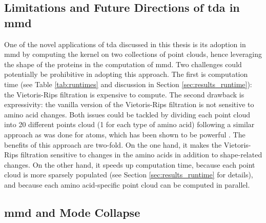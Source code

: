 

\subsection{Limitations and Future Directions of \gls{tda} in \gls{mmd}}\label{sec:tda_limitations}

One of the novel applications of \gls{tda} discussed in this thesis is its
adoption in \gls{mmd} by computing the kernel on two collections of point
clouds, hence leveraging the shape of the proteins in the computation of \gls{mmd}.
Two challenges could potentially be prohibitive in adopting this approach. The
first is computation time (see Table \ref{tab:runtimes} and discussion in
Section \ref{sec:results_runtime}): the Vietoris-Rips filtration is expensive
to compute. The second drawback is expressivity: the vanilla version of the
Vietoris-Rips filtration is not sensitive to amino acid changes. Both issues
could be tackled by dividing each point cloud into 20 different points cloud (1
for each type of amino acid) following a similar approach as was done for atoms,
which has been shown to be powerful \citep{jiang2021topological}. The benefits
of this approach are two-fold. On the one hand, it makes the Vietoris-Rips
filtration sensitive to changes in the amino acids in addition to shape-related
changes. On the other hand, it speeds up computation time, because each point
cloud is more sparsely populated (see Section \ref{sec:results_runtime} for
details), and because each amino acid-specific point cloud can be computed in
parallel.


\subsection{\gls{mmd} and  Mode Collapse}\label{sec:mode_collapse_mode_drop}

